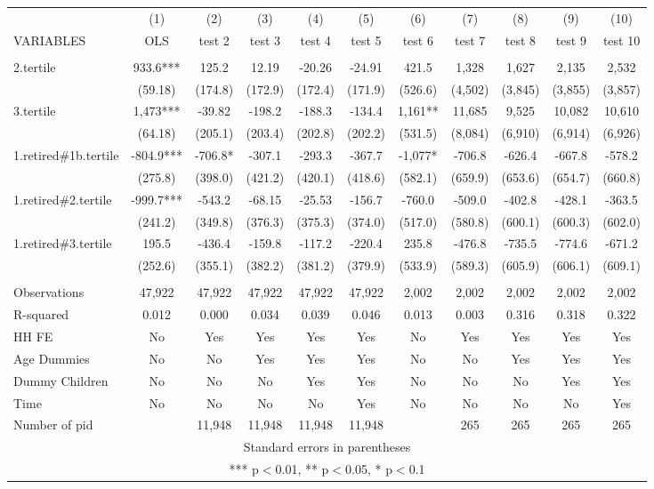 \begin{tabular}{lcccccccccc} \hline
 & (1) & (2) & (3) & (4) & (5) & (6) & (7) & (8) & (9) & (10) \\
VARIABLES & OLS & test 2 & test 3 & test 4 & test 5 & test 6 & test 7 & test 8 & test 9 & test 10 \\ \hline
 &  &  &  &  &  &  &  &  &  &  \\
2.tertile & 933.6*** & 125.2 & 12.19 & -20.26 & -24.91 & 421.5 & 1,328 & 1,627 & 2,135 & 2,532 \\
 & (59.18) & (174.8) & (172.9) & (172.4) & (171.9) & (526.6) & (4,502) & (3,845) & (3,855) & (3,857) \\
3.tertile & 1,473*** & -39.82 & -198.2 & -188.3 & -134.4 & 1,161** & 11,685 & 9,525 & 10,082 & 10,610 \\
 & (64.18) & (205.1) & (203.4) & (202.8) & (202.2) & (531.5) & (8,084) & (6,910) & (6,914) & (6,926) \\
1.retired\#1b.tertile & -804.9*** & -706.8* & -307.1 & -293.3 & -367.7 & -1,077* & -706.8 & -626.4 & -667.8 & -578.2 \\
 & (275.8) & (398.0) & (421.2) & (420.1) & (418.6) & (582.1) & (659.9) & (653.6) & (654.7) & (660.8) \\
1.retired\#2.tertile & -999.7*** & -543.2 & -68.15 & -25.53 & -156.7 & -760.0 & -509.0 & -402.8 & -428.1 & -363.5 \\
 & (241.2) & (349.8) & (376.3) & (375.3) & (374.0) & (517.0) & (580.8) & (600.1) & (600.3) & (602.0) \\
1.retired\#3.tertile & 195.5 & -436.4 & -159.8 & -117.2 & -220.4 & 235.8 & -476.8 & -735.5 & -774.6 & -671.2 \\
 & (252.6) & (355.1) & (382.2) & (381.2) & (379.9) & (533.9) & (589.3) & (605.9) & (606.1) & (609.1) \\
 &  &  &  &  &  &  &  &  &  &  \\
Observations & 47,922 & 47,922 & 47,922 & 47,922 & 47,922 & 2,002 & 2,002 & 2,002 & 2,002 & 2,002 \\
R-squared & 0.012 & 0.000 & 0.034 & 0.039 & 0.046 & 0.013 & 0.003 & 0.316 & 0.318 & 0.322 \\
HH FE & No & Yes & Yes & Yes & Yes & No & Yes & Yes & Yes & Yes \\
Age Dummies & No & No & Yes & Yes & Yes & No & No & Yes & Yes & Yes \\
Dummy Children & No & No & No & Yes & Yes & No & No & No & Yes & Yes \\
Time & No & No & No & No & Yes & No & No & No & No & Yes \\
 Number of pid &  & 11,948 & 11,948 & 11,948 & 11,948 &  & 265 & 265 & 265 & 265 \\ \hline
\multicolumn{11}{c}{ Standard errors in parentheses} \\
\multicolumn{11}{c}{ *** p$<$0.01, ** p$<$0.05, * p$<$0.1} \\
\end{tabular}
